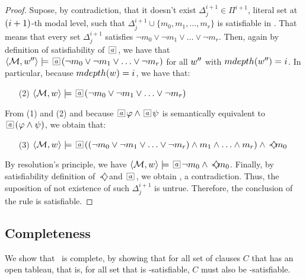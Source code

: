 \begin{proof}
    Supose, by contradiction, that it doesn't exist $\Delta^{i+1}_j \in
    \Pi^{i+1}$, literal set at $(\ml+1)$-th modal level, such that
    $\Delta^{i+1}_j\cup\{m_0,m_1,\ldots,m_r\}$ is satisfiable in \Model. That
    means that every set $\Delta^{i+1}_j$ satisfies $\neg m_0 \lor \neg m_1 \lor
    \ldots \lor \neg m_r$. Then, again by definition of satisfiability of
    $\nec{a}$, we have that $\sat{\Model}{\st''}{\nec{a}(\neg m_0\lor\neg
    m_1\lor\ldots\lor\neg m_r)}$ for all $\st''$ with $mdepth(\st'')=i$. In
    particular, because $mdepth(\st) = i$, we have that:
    \begin{itemize}
        \item[(2)] $\sat{\Model}{\st}{\nec{a}(\neg m_0 \lor \neg m_1 \lor \ldots
            \lor \neg m_r)}$
    \end{itemize}
    From (1) and (2) and because $\nec{a}\formula\land\nec{a}\psi$ is
    semantically equivalent to $\nec{a}(\formula\land\psi)$, we obtain that:
    \begin{itemize}
        \item[(3)] $\sat{\Model}{\st}{\nec{a}((\neg m_0 \lor \neg m_1 \lor
                \ldots \lor \neg m_r)\land m_1 \land \ldots \land m_r) \land
            \pos{a} m_0}$ 
    \end{itemize}
    By resolution's principle, we have $\sat{\Model}{\st}{\nec{a}\neg m_0 \land
    \pos{a}m_0}$. Finally, by satisfiability definition of $\pos{a}$ and
    $\nec{a}$, we obtain , a contradiction.
    Thus, the suposition of not existence of such $\Delta^{i+1}_j$ is untrue.
    Therefore, the conclusion of the rule is satisfiable.
\end{proof}

\subsection{Completeness}
\label{sec:complete}

We show that \ckn~is complete, by showing that for all set of clauses $C$ that
has an open tableau, that is, for all set that is \ckn-satisfiable, $C$ must
also be -satisfiable.

